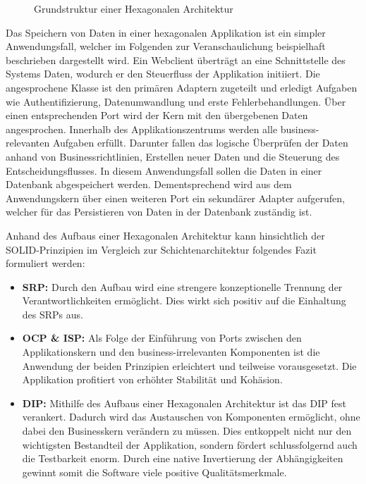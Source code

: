 
\begin{figure}[htbp]
	\centering
	
	\caption{Grundstruktur einer Hexagonalen Architektur}
	\label{fig:HexagonaleArchitektur}
\end{figure}

Das Speichern von Daten in einer hexagonalen Applikation ist ein simpler Anwendungsfall, welcher im Folgenden zur Veranschaulichung beispielhaft beschrieben dargestellt wird. Ein Webclient überträgt an eine Schnittstelle des Systems Daten, wodurch er den Steuerfluss der Applikation initiiert. Die angesprochene Klasse ist den primären Adaptern zugeteilt und erledigt Aufgaben wie Authentifizierung, Datenumwandlung und erste Fehlerbehandlungen. Über einen entsprechenden Port wird der Kern mit den übergebenen Daten angesprochen. Innerhalb des Applikationszentrums werden alle business-relevanten Aufgaben erfüllt. Darunter fallen das logische Überprüfen der Daten anhand von Businessrichtlinien, Erstellen neuer Daten und die Steuerung des Entscheidungsflusses. In diesem Anwendungsfall sollen die Daten in einer Datenbank abgespeichert werden. Dementsprechend wird aus dem Anwendungskern über einen weiteren Port ein sekundärer Adapter aufgerufen, welcher für das Persistieren von Daten in der Datenbank zuständig ist.

Anhand des Aufbaus einer Hexagonalen Architektur kann hinsichtlich der SOLID-Prinzipien im Vergleich zur Schichtenarchitektur folgendes Fazit formuliert werden:

\begin{itemize}[topsep=-2pt]
	\item \textbf{\acrshort{SRP}: } {Durch den Aufbau wird eine strengere konzeptionelle Trennung der Verantwortlichkeiten ermöglicht. Dies wirkt sich positiv auf die Einhaltung des \acrlong{SRP}s aus.}
	\item \textbf{\acrshort{OCP} \& \acrshort{ISP}: } {Als Folge der Einführung von Ports zwischen den Applikationskern und den business-irrelevanten Komponenten ist die Anwendung der beiden Prinzipien erleichtert und teilweise vorausgesetzt. Die Applikation profitiert von erhöhter Stabilität und Kohäsion. }
	\item \textbf{\acrshort{DIP}: } {Mithilfe des Aufbaus einer Hexagonalen Architektur ist das \acrlong{DIP} fest verankert. Dadurch wird das Austauschen von Komponenten ermöglicht, ohne dabei den Businesskern verändern zu müssen. Dies entkoppelt nicht nur den wichtigsten Bestandteil der Applikation, sondern fördert schlussfolgernd auch die Testbarkeit enorm. Durch eine native Invertierung der Abhängigkeiten gewinnt somit die Software viele positive Qualitätsmerkmale. \cite{Alliaume.2018, Martinez.2021}}
\end{itemize}


